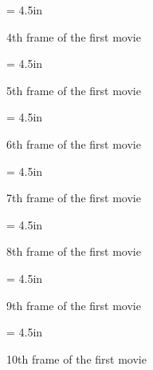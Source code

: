 \begin{figure}[htb]
\begin{center}
\epsfxsize = 4.5in
\caption[4th frame of movie \#1]
{4th frame of the first movie}
\label{fig:movie1.4}
\end{center}
\end{figure}

\begin{figure}[htb]
\begin{center}
\epsfxsize = 4.5in
\caption[5th frame of movie \#1]
{5th frame of the first movie}
\label{fig:movie1.5}
\end{center}
\end{figure}

\begin{figure}[htb]
\begin{center}
\epsfxsize = 4.5in
\caption[6th frame of movie \#1]
{6th frame of the first movie}
\label{fig:movie1.6}
\end{center}
\end{figure}

\begin{figure}[htb]
\begin{center}
\epsfxsize = 4.5in
\caption[7th frame of movie \#1]
{7th frame of the first movie}
\label{fig:movie1.7}
\end{center}
\end{figure}

\begin{figure}[htb]
\begin{center}
\epsfxsize = 4.5in
\caption[8th frame of movie \#1]
{8th frame of the first movie}
\label{fig:movie1.8}
\end{center}
\end{figure}

\begin{figure}[htb]
\begin{center}
\epsfxsize = 4.5in
\caption[9th frame of movie \#1]
{9th frame of the first movie}
\label{fig:movie1.9}
\end{center}
\end{figure}

\begin{figure}[htb]
\begin{center}
\epsfxsize = 4.5in
\caption[10th frame of movie \#1]
{10th frame of the first movie}
\label{fig:movie1.10}
\end{center}
\end{figure}

